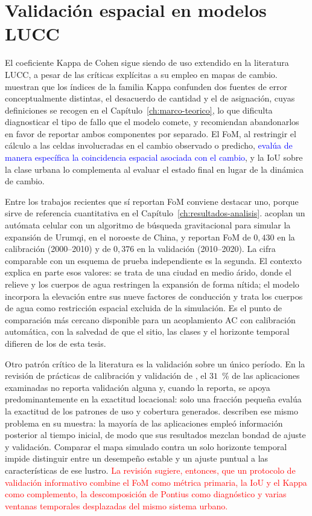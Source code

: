 \section{Validación espacial en modelos LUCC}
\label{sec:validacion-literatura}

El coeficiente Kappa de Cohen sigue siendo de uso extendido en la literatura
LUCC, a pesar de las críticas explícitas a su empleo en mapas de cambio.
\textcite{PontiusMillones2011} muestran que los índices de la familia Kappa
confunden dos fuentes de error conceptualmente distintas, el desacuerdo de
cantidad y el de asignación, cuyas definiciones se recogen en el
Capítulo~\ref{ch:marco-teorico}, lo que dificulta diagnosticar el tipo de
fallo que el modelo comete, y recomiendan abandonarlos en favor de reportar
ambos componentes por separado. El FoM, al restringir el cálculo a las celdas
involucradas en el cambio observado o predicho, \textcolor{blue}{evalúa de
manera específica la coincidencia espacial asociada con el cambio}, y la IoU
sobre la clase urbana lo complementa al evaluar el estado final en lugar de la
dinámica de cambio.

Entre los trabajos recientes que sí reportan FoM conviene destacar uno, porque
sirve de referencia cuantitativa en el Capítulo~\ref{ch:resultados-analisis}.
\textcite{Tang2024} acoplan un autómata celular con un algoritmo de búsqueda
gravitacional para simular la expansión de Urumqi, en el noroeste de China, y
reportan FoM de $0{,}430$ en la calibración (2000--2010) y de $0{,}376$ en la
validación (2010--2020). La cifra comparable con un esquema de prueba
independiente es la segunda. El contexto explica en parte esos valores: se
trata de una ciudad en medio árido, donde el relieve y los cuerpos de agua
restringen la expansión de forma nítida; el modelo incorpora la elevación entre
sus nueve factores de conducción y trata los cuerpos de agua como restricción
espacial excluida de la simulación. Es el punto de comparación más cercano
disponible para un acoplamiento AC con calibración automática, con la salvedad
de que el sitio, las clases y el horizonte temporal difieren de los de esta
tesis.

Otro patrón crítico de la literatura es la validación sobre un único período.
En la revisión de prácticas de calibración y validación de
\textcite{vanVliet2016}, el $31$~\% de las aplicaciones examinadas no reporta
validación alguna y, cuando la reporta, se apoya predominantemente en la
exactitud locacional: solo una fracción pequeña evalúa la exactitud de los
patrones de uso y cobertura generados. \textcite{pontius2008comparing}
describen ese mismo problema en su muestra: la mayoría de las aplicaciones
empleó información posterior al tiempo inicial, de modo que sus resultados
mezclan bondad de ajuste y validación. Comparar el mapa simulado contra un
solo horizonte temporal impide distinguir entre un desempeño estable y un
ajuste puntual a las características de ese lustro. \textcolor{red}{La revisión
sugiere, entonces, que un protocolo de validación informativo combine el FoM
como métrica primaria, la IoU y el Kappa como complemento, la descomposición de
Pontius como diagnóstico y varias ventanas temporales desplazadas del mismo
sistema urbano.}

